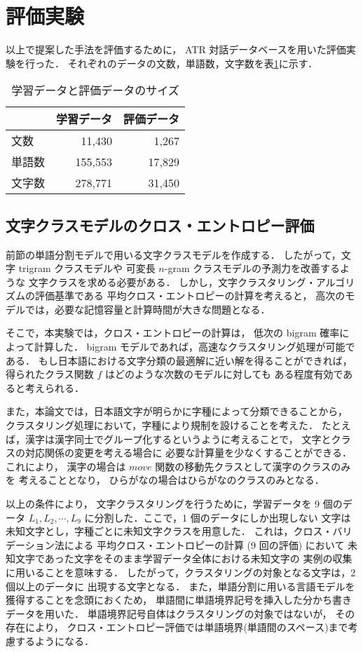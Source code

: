 \section{評価実験}

以上で提案した手法を評価するために，
ATR 対話データベースを用いた評価実験を行った．
それぞれのデータの文数，単語数，文字数を表\ref{Tab:datasize}に示す．
\begin{table}[hbt]
\begin{center}
\caption{学習データと評価データのサイズ}
\label{Tab:datasize}
\begin{tabular}{l|r|r}
\hline
\hline
 & 学習データ & 評価データ\\
\hline
文数 & 11,430 & 1,267\\
\hline
単語数 & 155,553 & 17,829\\
\hline
文字数 & 278,771 & 31,450\\
\hline
\end{tabular}
\end{center}
\end{table}

\subsection{文字クラスモデルのクロス・エントロピー評価}

前節の単語分割モデルで用いる文字クラスモデルを作成する．
したがって，文字 trigram クラスモデルや
可変長 $n$-gram クラスモデルの予測力を改善するような
文字クラスを求める必要がある．
しかし，文字クラスタリング・アルゴリズムの評価基準である
平均クロス・エントロピーの計算を考えると，
高次のモデルでは，必要な記憶容量と計算時間が大きな問題となる．

そこで，本実験では，クロス・エントロピーの計算は，
低次の bigram 確率によって計算した．
bigram モデルであれば，高速なクラスタリング処理が可能である．
もし日本語における文字分類の最適解に近い解を得ることができれば，
得られたクラス関数 $f$ はどのような次数のモデルに対しても
ある程度有効であると考えられる．

また，本論文では，日本語文字が明らかに字種によって分類できることから，
クラスタリング処理において，字種により規制を設けることを考えた．
たとえば，漢字は漢字同士でグループ化するというように考えることで，
文字とクラスの対応関係の変更を考える場合に
必要な計算量を少なくすることができる．これにより，
漢字の場合は $move$ 関数の移動先クラスとして漢字のクラスのみを
考えることとなり，
ひらがなの場合はひらがなのクラスのみとなる．

以上の条件により，
文字クラスタリングを行うために，学習データを 9 個のデータ
$L_1, L_2, \cdots, L_9$ に分割した．ここで，1 個のデータにしか出現しない
文字は未知文字とし，字種ごとに未知文字クラスを用意した．
これは，クロス・バリデーション法による
平均クロス・エントロピーの計算 (9 回の評価) において
未知文字であった文字をそのまま学習データ全体における未知文字の
実例の収集に用いることを意味する．
したがって，クラスタリングの対象となる文字は，2 個以上のデータに
出現する文字となる．
また，単語分割に用いる言語モデルを獲得することを念頭におくため，
単語間に単語境界記号を挿入した分かち書きデータを用いた．
単語境界記号自体はクラスタリングの対象ではないが，
その存在により，
クロス・エントロピー評価では単語境界(単語間のスペース)まで考慮するようになる．

